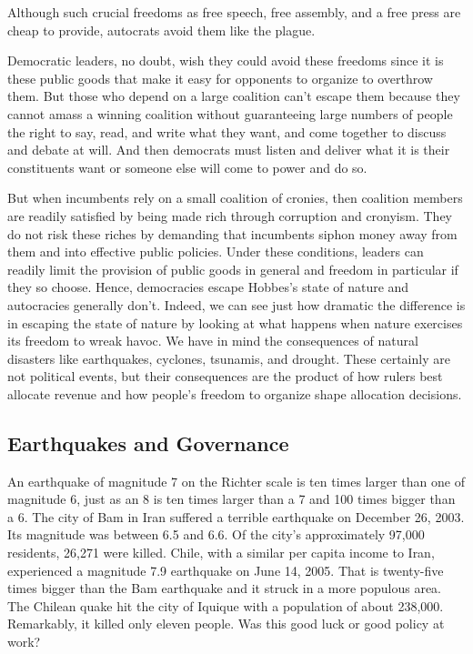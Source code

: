\documentclass[10pt]{article}
\begin{document}
{\large Although such crucial freedoms as free speech, free assembly, and a free
press are cheap to provide, autocrats avoid them like the plague.}

{\large Democratic leaders, no doubt, wish they could avoid these freedoms since
it is these public goods that make it easy for opponents to organize to overthrow
them. But those who depend on a large coalition can't escape them because they
cannot amass a winning coalition without guaranteeing large numbers of people the
right to say, read, and write what they want, and come together to discuss and
debate at will. And then democrats must listen and deliver what it is their
constituents want or someone else will come to power and do so.}

{\large But when incumbents rely on a small coalition of cronies, then coalition
members are readily satisfied by being made rich through corruption and cronyism.
They do not risk these riches by demanding that incumbents siphon money away from
them and into effective public policies. Under these conditions, leaders can
readily limit the provision of public goods in general and freedom in particular
if they so choose. Hence, democracies escape Hobbes's state of nature and
autocracies generally don't. Indeed, we can see just how dramatic the difference
is in escaping the state of nature by looking at what happens when nature
exercises its freedom to wreak havoc. We have in mind the consequences of natural
disasters like earthquakes, cyclones, tsunamis, and drought. These certainly are
not political events, but their consequences are the product of how rulers best
allocate revenue and how people's freedom to organize shape allocation
decisions.}

\subsection{Earthquakes and Governance}

{\large An earthquake of magnitude 7 on the Richter scale is ten times larger
than one of magnitude 6, just as an 8 is ten times larger than a 7 and 100 times
bigger than a 6. The city of Bam in Iran suffered a terrible earthquake on
December 26, 2003. Its magnitude was between 6.5 and 6.6. Of the city's
approximately 97,000 residents, 26,271 were killed. Chile, with a similar per
capita income to Iran, experienced a magnitude 7.9 earthquake on June 14, 2005.
That is twenty-five times bigger than the Bam earthquake and it struck in a more
populous area. The Chilean quake hit the city of Iquique with a population of
about 238,000. Remarkably, it killed only eleven people. Was this good luck or
good policy at work?}
\end{document}

